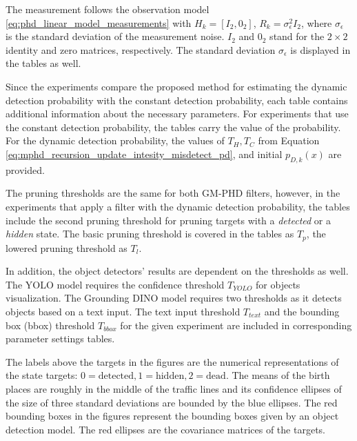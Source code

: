 The measurement follows the observation model \eqref{eq:phd_linear_model_measurements} with $H_k = [I_2, 0_2]$, $R_k
= \sigma_{\epsilon}^2I_2$, where $ \sigma_{\epsilon}$ is the standard deviation of the measurement noise.  $I_2$ and $0_2$ stand for
the $2\times 2$ identity and zero matrices, respectively.
The standard deviation $\sigma_{\epsilon}$ is displayed in the tables as well.

Since the experiments compare the proposed method for estimating the dynamic detection probability with the constant
detection probability, each table contains additional information about the necessary parameters. For experiments that
use the constant
detection probability, the tables carry the value of the probability. For the dynamic detection probability, the values of $T_H, T_C$
from Equation \eqref{eq:mphd_recursion_update_intesity_misdetect_pd},
and initial $p_{D,k}(x)$ are provided.

The pruning thresholds are the same for both GM-PHD filters, however, in the experiments that apply a filter with the
dynamic detection probability, the tables
include the second pruning threshold for pruning targets with a \textit{detected} or a \textit{hidden} state. The basic
pruning threshold is covered in the tables as $T_p$, the lowered pruning threshold as $T_l$.

In addition, the object detectors' results are dependent on the thresholds as well. \linebreak The YOLO model requires the confidence
threshold $T_{YOLO}$ for objects visualization. The Grounding DINO model requires two thresholds as it detects objects based on a text input. The text input threshold $T_{text}$ and the bounding box (bbox) threshold $T_{bbox}$ for the given experiment are included in corresponding parameter settings tables.

The labels above
the targets in the figures are the numerical representations of the state targets: $0=\text{detected}, 1=\text{hidden}, 2=\text{dead}$. The means of the birth places are roughly in the middle of the traffic lines and its confidence ellipses of the size of
three standard
deviations are bounded by the blue ellipses. The red bounding boxes in the figures represent the bounding
boxes given by an object detection model. The red ellipses are the covariance matrices of the targets.
















